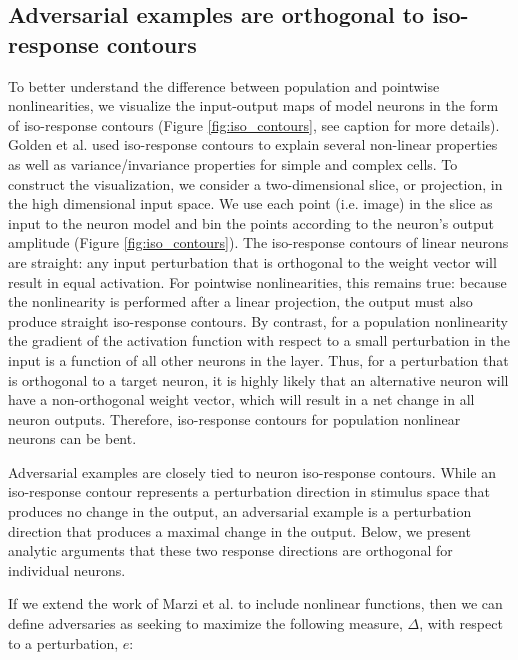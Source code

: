 \subsection{Adversarial examples are orthogonal to iso-response contours}
To better understand the difference between population and pointwise nonlinearities, we visualize the input-output maps of model neurons in the form of iso-response contours (Figure \ref{fig:iso_contours}, see caption for more details). Golden et al. \citeyearpar{golden2016conjectures} used iso-response contours to explain several non-linear properties as well as variance/invariance properties for simple and complex cells. To construct the visualization, we consider a two-dimensional slice, or projection, in the high dimensional input space. We use each point (i.e. image) in the slice as input to the neuron model and bin the points according to the neuron's output amplitude (Figure \ref{fig:iso_contours}). The iso-response contours of linear neurons are straight: any input perturbation that is orthogonal to the weight vector will result in equal activation. For pointwise nonlinearities, this remains true: because the nonlinearity is performed after a linear projection, the output must also produce straight iso-response contours. By contrast, for a population nonlinearity the gradient of the activation function with respect to a small perturbation in the input is a function of all other neurons in the layer. Thus, for a perturbation that is orthogonal to a target neuron, it is highly likely that an alternative neuron will have a non-orthogonal weight vector, which will result in a net change in all neuron outputs. Therefore, iso-response contours for population nonlinear neurons can be bent.

Adversarial examples are closely tied to neuron iso-response contours. While an iso-response contour represents a perturbation direction in stimulus space that produces no change in the output, an adversarial example is a perturbation direction that produces a maximal change in the output. Below, we present analytic arguments that these two response directions are orthogonal for individual neurons.

If we extend the work of Marzi et al. \citeyearpar{marzi2018sparsity} to include nonlinear functions, then we can define adversaries as seeking to maximize the following measure, $\Delta$, with respect to a perturbation, $e$:

